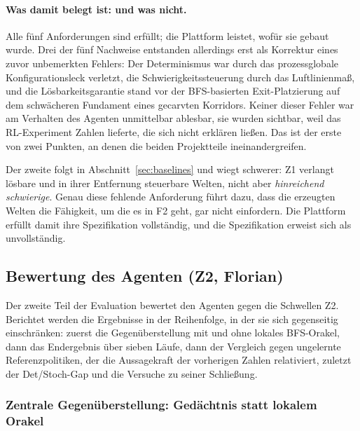\documentclass[11pt,a4paper]{article}
\begin{document}
\paragraph{Was damit belegt ist: und was nicht.} Alle fünf Anforderungen
sind erfüllt; die Plattform leistet, wofür sie gebaut wurde. Drei der fünf
Nachweise entstanden allerdings erst als Korrektur eines zuvor unbemerkten
Fehlers: Der Determinismus war durch das prozessglobale Konfigurationsleck
verletzt, die Schwierigkeitssteuerung durch das Luftlinienmaß, und die
Lösbarkeitsgarantie stand vor der BFS-basierten Exit-Platzierung auf dem
schwächeren Fundament eines gecarvten Korridors. Keiner dieser Fehler war am
Verhalten des Agenten unmittelbar ablesbar, sie wurden sichtbar, weil das
RL-Experiment Zahlen lieferte, die sich nicht erklären ließen. Das ist der erste
von zwei Punkten, an denen die beiden Projektteile ineinandergreifen.

Der zweite folgt in Abschnitt~\ref{sec:baselines} und wiegt schwerer: Z1
verlangt lösbare und in ihrer Entfernung steuerbare Welten, nicht aber
\emph{hinreichend schwierige}. Genau diese fehlende Anforderung führt dazu,
dass die erzeugten Welten die Fähigkeit, um die es in F2 geht, gar nicht
einfordern. Die Plattform erfüllt damit ihre Spezifikation vollständig, und
die Spezifikation erweist sich als unvollständig.

\subsection{Bewertung des Agenten (Z2, Florian)}
\label{sec:evalagent}

Der zweite Teil der Evaluation bewertet den Agenten gegen die Schwellen Z2.
Berichtet werden die Ergebnisse in der Reihenfolge, in der sie sich
gegenseitig einschränken: zuerst die Gegenüberstellung mit und ohne lokales
BFS-Orakel, dann das Endergebnis über sieben Läufe, dann der Vergleich gegen
ungelernte Referenzpolitiken, der die Aussagekraft der vorherigen Zahlen
relativiert, zuletzt der Det/Stoch-Gap und die Versuche zu seiner Schließung.

\subsubsection{Zentrale Gegenüberstellung: Gedächtnis statt lokalem Orakel}
\label{sec:ablation}
\end{document}
